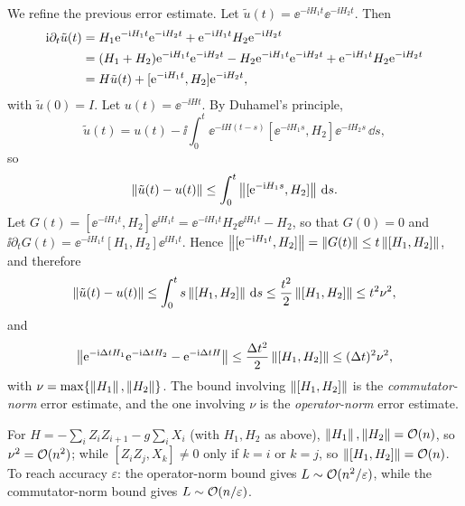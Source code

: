 We refine the previous error estimate. Let
$\tilde{u}(t) = \ee^{-\ii H_1 t}\ee^{-\ii H_2 t}$. Then
\begin{align}
  \mathrm{i}\partial_t \tilde{u}(t)
  &= H_1 \mathrm{e}^{-\mathrm{i} H_1 t}\mathrm{e}^{-\mathrm{i} H_2 t} + \mathrm{e}^{-\mathrm{i} H_1 t} H_2 \mathrm{e}^{-\mathrm{i} H_2 t} \notag\\
  &= (H_1 + H_2)\mathrm{e}^{-\mathrm{i} H_1 t}\mathrm{e}^{-\mathrm{i} H_2 t} - H_2 \mathrm{e}^{-\mathrm{i} H_1 t}\mathrm{e}^{-\mathrm{i} H_2 t} + \mathrm{e}^{-\mathrm{i} H_1 t} H_2 \mathrm{e}^{-\mathrm{i} H_2 t} \notag\\
  &= H\tilde{u}(t) + [\mathrm{e}^{-\mathrm{i} H_1 t}, H_2]\mathrm{e}^{-\mathrm{i} H_2 t},
\end{align}
with $\tilde{u}(0) = I$. Let $u(t) = \ee^{-\ii H t}$. By Duhamel's principle,
\begin{equation}
  \tilde{u}(t) = u(t) - \ii\int_0^t \ee^{-\ii H(t-s)}[\ee^{-\ii H_1 s}, H_2]\ee^{-\ii H_2 s}\,\dd s,
\end{equation}
so
\begin{equation}
  \left\lVert \tilde{u}(t) - u(t) \right\rVert \le \int_0^t \left\lVert [\mathrm{e}^{-\mathrm{i} H_1 s}, H_2] \right\rVert\,\mathrm{d} s.
\end{equation}
Let $G(t) = [\ee^{-\ii H_1 t}, H_2]\ee^{\ii H_1 t} = \ee^{-\ii H_1 t} H_2 \ee^{\ii H_1 t} - H_2$,
so that $G(0) = 0$ and $\ii\partial_t G(t) = \ee^{-\ii H_1 t}[H_1, H_2]\ee^{\ii H_1 t}$.
Hence $\left\lVert [\mathrm{e}^{-\mathrm{i} H_1 t}, H_2] \right\rVert = \left\lVert G(t) \right\rVert \le t\left\lVert [H_1, H_2] \right\rVert$, and
therefore
\begin{equation}
  \left\lVert \tilde{u}(t) - u(t) \right\rVert \le \int_0^t s\left\lVert [H_1, H_2] \right\rVert\,\mathrm{d} s
  \le \frac{t^2}{2}\left\lVert [H_1, H_2] \right\rVert \le t^2 \nu^2,
\end{equation}
and
\begin{equation}
  \left\lVert \mathrm{e}^{-\mathrm{i} \Delta t H_1}\mathrm{e}^{-\mathrm{i} \Delta t H_2} - \mathrm{e}^{-\mathrm{i} \Delta t H} \right\rVert
  \le \frac{\Delta t^2}{2}\left\lVert [H_1, H_2] \right\rVert \le (\Delta t)^2 \nu^2,
\end{equation}
with $\nu = \max\{\left\lVert H_1 \right\rVert, \left\lVert H_2 \right\rVert\}$. The bound involving
$\left\lVert [H_1,H_2] \right\rVert$ is the \emph{commutator-norm} error estimate, and the one
involving $\nu$ is the \emph{operator-norm} error estimate.

\begin{example}
For $H = -\sum_i Z_i Z_{i+1} - g\sum_i X_i$ (with $H_1, H_2$ as above),
$\left\lVert H_1 \right\rVert, \left\lVert H_2 \right\rVert = \mathcal{O}(n)$, so $\nu^2 = \mathcal{O}(n^2)$; while
$[Z_i Z_j, X_k] \neq 0$ only if $k = i$ or $k = j$, so
$\left\lVert [H_1, H_2] \right\rVert = \mathcal{O}(n)$. To reach accuracy $\varepsilon$: the
operator-norm bound gives $L \sim \mathcal{O}(n^2/\varepsilon)$, while the
commutator-norm bound gives $L \sim \mathcal{O}(n/\varepsilon)$.
\end{example}

